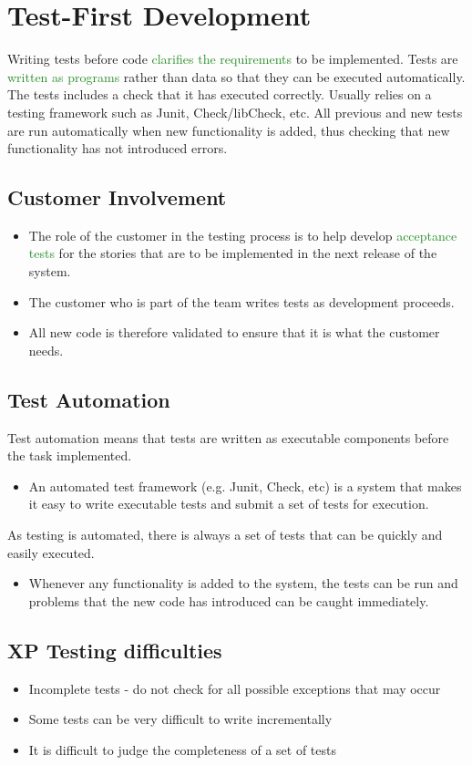 \documentclass{report}
\newcommand{\textg}[1]{\textcolor{ForestGreen}{#1}}
\begin{document}
\section{Test-First Development}
\noindent Writing tests before code \textg{clarifies the requirements} to be implemented. Tests are \textg{written as programs} rather than data so that they can be executed automatically. The tests includes a check that it has executed correctly. Usually relies on a testing framework such as Junit, Check/libCheck, etc. All previous and new tests are run automatically when new functionality is added, thus checking that new functionality has not introduced errors.

\subsection{Customer Involvement}
\begin{itemize}
  \item The role of the customer in the testing process is to help develop \textg{acceptance tests} for the stories that are to be implemented in the next release of the system.
  \item The customer who is part of the team writes tests as development proceeds.
  \item All new code is therefore validated to ensure that it is what the customer needs.
\end{itemize}

\subsection{Test Automation}
\noindent Test automation means that tests are written as executable components before the task implemented.
\begin{itemize}
  \item An automated test framework (e.g. Junit, Check, etc) is a system that makes it easy to write executable tests and submit a set of tests for execution.
\end{itemize}
As testing is automated, there is always a set of tests that can be quickly and easily executed.
\begin{itemize}
  \item Whenever any functionality is added to the system, the tests can be run and problems that the new code has introduced can be caught immediately.
\end{itemize}

\subsection{XP Testing difficulties}
\begin{itemize}
  \item Incomplete tests - do not check for all possible exceptions that may occur
  \item Some tests can be very difficult to write incrementally
  \item It is difficult to judge the completeness of a set of tests
\end{itemize}
\end{document}
